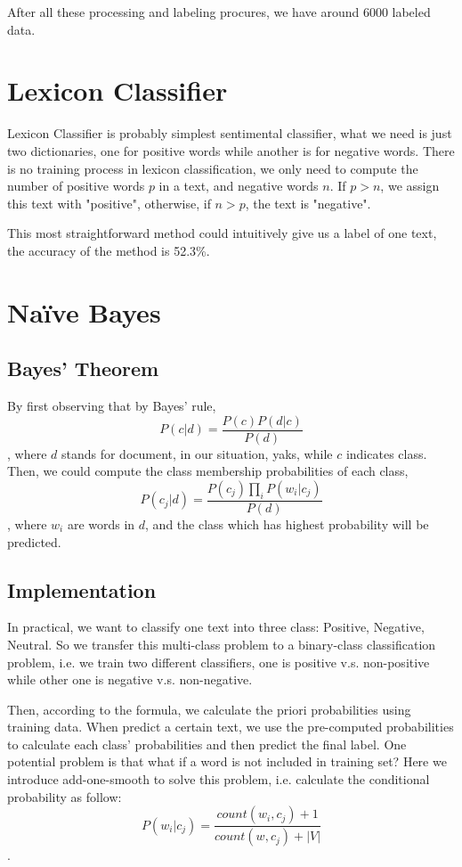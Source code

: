 \documentclass{article}
\begin{document}
      After all these processing and labeling procures, we have around 6000 labeled data.

  \section{Lexicon Classifier}
    Lexicon Classifier is probably simplest sentimental classifier, what we need is just two dictionaries, one for positive words while another is for negative words. There is no training process in lexicon classification, we only need to compute the number of positive words $p$ in a text, and negative words $n$. If $p>n$, we assign this text with "positive", otherwise, if $n>p$, the text is "negative".

    This most straightforward method could intuitively give us a label of one text, the accuracy of the method is 52.3\%.
  \section{Na\"ive Bayes}
    \subsection{Bayes' Theorem}
      By first observing that by Bayes' rule,
      $$P(c|d)=\frac{P(c)P(d|c)}{P(d)}$$,
      where $d$ stands for document, in our situation, yaks, while $c$ indicates class. Then, we could compute the class membership probabilities of each class,
      $$P(c_j|d)=\frac{P(c_j)\prod_i P(w_i|c_j)}{P(d)}$$,
      where $w_i$ are words in $d$, and the class which has highest probability will be predicted.

    \subsection{Implementation}
      In practical, we want to classify one text into three class: Positive, Negative, Neutral. So we transfer this multi-class problem to a binary-class classification problem, i.e. we train two different classifiers, one is positive v.s. non-positive while other one is negative v.s. non-negative. 

      Then, according to the formula, we calculate the priori probabilities using training data. When predict a certain text, we use the pre-computed probabilities to calculate each class' probabilities and then predict the final label. One potential problem is that what if a word is not included in training set? Here we introduce add-one-smooth to solve this problem, i.e. calculate the conditional probability as follow:
      $$P(w_i|c_j) = \frac{count(w_i,c_j)+1}{count(w,c_j)+|V|}$$.
\end{document}
